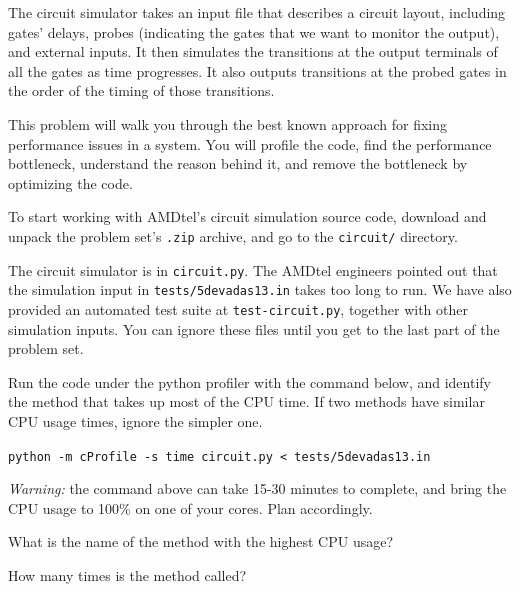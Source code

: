 \documentclass[12pt,twoside]{article}
\begin{document}
\begin{problems}
The circuit simulator takes an input file that describes a circuit layout,
including gates' delays, probes (indicating the gates that we want to
monitor the output), and external inputs. It then simulates the transitions at
the output terminals of all the gates as time progresses. It also outputs
transitions at the probed gates in the order of the timing of those
transitions.

This problem will walk you through the best known approach for fixing
performance issues in a system. You will profile the code, find the performance
bottleneck, understand the reason behind it, and remove the bottleneck by
optimizing the code.

To start working with AMDtel's circuit simulation source code, download and
unpack the problem set's \texttt{.zip} archive, and go to the \texttt{circuit/}
directory.

The circuit simulator is in \texttt{circuit.py}. The AMDtel engineers pointed
out that the simulation input in \texttt{tests/5devadas13.in} takes too long
to run. We have also provided an automated test suite at
\texttt{test-circuit.py}, together with other simulation inputs. You can ignore
these files until you get to the last part of the problem set.

\begin{problemparts}

\problempart {} Run the code under the python profiler with the command
below, and identify the method that takes up most of the CPU time. If two
methods have similar CPU usage times, ignore the simpler one.

\texttt{python -m cProfile -s time circuit.py < tests/5devadas13.in}

\textit{Warning:} the command above can take 15-30 minutes to complete, and
bring the CPU usage to 100\% on one of your cores. Plan accordingly.

What is the name of the method with the highest CPU usage?



\problempart {} How many times is the method called?


\end{problemparts}
\end{problems}
\end{document}
